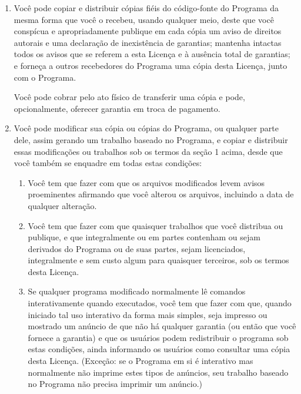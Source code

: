 {\begin{enumerate}
Atividades outras que a cópia, a distribuição e modificação não estão
cobertas por esta Licença; elas estão fora de seu escopo.  O ato de
executar o Programa não é restringido e o resultado do Programa é
coberto apenas se seu conteúdo contenha trabalhos baseados no Programa
(independentemente de terem sido gerados pela execução do
Programa). Se isso é verdadeiro depende do que o programa faz.

\item Você pode copiar e distribuir cópias fiéis do código-fonte do
Programa da mesma forma que você o recebeu, usando qualquer meio,
deste que você conspícua e apropriadamente publique em cada cópia um
aviso de direitos autorais e uma declaração de inexistência de
garantias; mantenha intactas todos os avisos que se referem a esta
Licença e à ausência total de garantias; e forneça a outros
recebedores do Programa uma cópia desta Licença, junto com o Programa.

Você pode cobrar pelo ato físico de transferir uma cópia e pode,
opcionalmente, oferecer garantia em troca de pagamento.

\item Você pode modificar sua cópia ou cópias do Programa, ou qualquer
parte dele, assim gerando um trabalho baseado no Programa, e copiar e
distribuir essas modificações ou trabalhos sob os termos da seção 1
acima, desde que você também se enquadre em todas estas condições:

\begin{enumerate}
    \item Você tem que fazer com que os arquivos modificados levem avisos
    proeminentes afirmando que você alterou os arquivos, incluindo a
    data de qualquer alteração.

    \item Você tem que fazer com que quaisquer trabalhos que você
    distribua ou publique, e que integralmente ou em partes contenham
    ou sejam derivados do Programa ou de suas partes, sejam
    licenciados, integralmente e sem custo algum para quaisquer
    terceiros, sob os termos desta Licença.

    \item Se qualquer programa modificado normalmente lê comandos
    interativamente quando executados, você tem que fazer com que,
    quando iniciado tal uso interativo da forma mais simples, seja
    impresso ou mostrado um anúncio de que não há qualquer garantia
    (ou então que você fornece a garantia) e que os usuários podem
    redistribuir o programa sob estas condições, ainda informando os
    usuários como consultar uma cópia desta Licença. (Exceção: se o
    Programa em si é interativo mas normalmente não imprime estes
    tipos de anúncios, seu trabalho baseado no Programa não precisa
    imprimir um anúncio.)
\end{enumerate}


\end{enumerate}}
